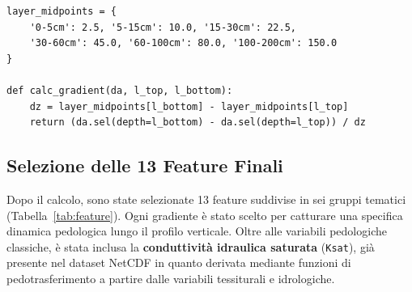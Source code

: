 \documentclass[a4paper,12pt]{article}
\begin{document}
\begin{lstlisting}[caption={Calcolo dei gradienti normalizzati tra strati consecutivi.},label={lst:gradient}]
layer_midpoints = {
    '0-5cm': 2.5, '5-15cm': 10.0, '15-30cm': 22.5,
    '30-60cm': 45.0, '60-100cm': 80.0, '100-200cm': 150.0
}

def calc_gradient(da, l_top, l_bottom):
    dz = layer_midpoints[l_bottom] - layer_midpoints[l_top]
    return (da.sel(depth=l_bottom) - da.sel(depth=l_top)) / dz
\end{lstlisting}

\subsection{Selezione delle 13 Feature Finali}

Dopo il calcolo, sono state selezionate 13 feature suddivise
in sei gruppi tematici (Tabella~\ref{tab:feature}). Ogni gradiente
è stato scelto per catturare una specifica dinamica pedologica lungo
il profilo verticale. Oltre alle variabili
pedologiche classiche, è stata inclusa la \textbf{conduttività idraulica
saturata} (\texttt{Ksat}), già presente nel dataset NetCDF in quanto
derivata mediante funzioni di pedotrasferimento a partire dalle
variabili tessiturali e idrologiche.
\end{document}
